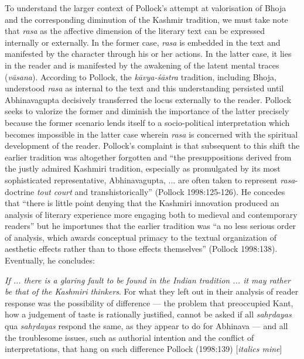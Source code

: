 To understand the larger context of Pollock's attempt at valorisation of Bhoja and the corresponding diminution of the Kashmir tradition, we must take note that \textsl{rasa} as the affective dimension of the literary text can be expressed internally or externally. In the former case, \textsl{rasa} is embedded in the text and manifested by the character through his or her actions. In the latter case, it lies in the reader and is manifested by the awakening of the latent mental traces (\textsl{vāsana}). According to Pollock, the \textsl{kāvya-śāstra} tradition, including Bhoja, understood \textsl{rasa} as internal to the text and this understanding persisted until Abhinavagupta decisively transferred the locus externally to the reader. Pollock seeks to valorize the former and diminish the importance of the latter precisely because the former scenario lends itself to a socio-political interpretation which becomes impossible in the latter case wherein \textsl{rasa} is concerned with the spiritual development of the reader. Pollock's complaint is that subsequent to this shift the earlier tradition was altogether forgotten and ``the presuppositions derived from the justly admired Kashmiri tradition, especially as promulgated by its most sophisticated representative, Abhinavagupta, ... are often taken to represent \textsl{rasa}-doctrine \textsl{tout court} and transhistorically'' (Pollock 1998:125-126). He concedes that ``there is little point denying that the Kashmiri innovation produced an analysis of literary experience more engaging both to medieval and contemporary readers'' but he importunes that the earlier tradition was ``a no less serious order of analysis, which awards conceptual primacy to the textual organization of aesthetic effects rather than to those effects themselves'' (Pollock 1998:138). Eventually, he concludes:

\smallskip

\begin{myquote}
{\textsl{If ... there is a glaring fault to be found in the Indian tradition ... it may rather be that of the Kashmiri thinkers}}. For what they left out in their analysis of reader response was the possibility of difference --- the problem that preoccupied Kant, how a judgement of taste is rationally justified, cannot be asked if all \textsl{sahṛdayas} qua \textsl{sahṛdayas} respond the same, as they appear to do for Abhinava --- and all the troublesome issues, such as authorial intention and the conflict of interpretations, that hang on such difference 
\hfill Pollock (1998:139) [\textsl{italics mine}]
\end{myquote}

